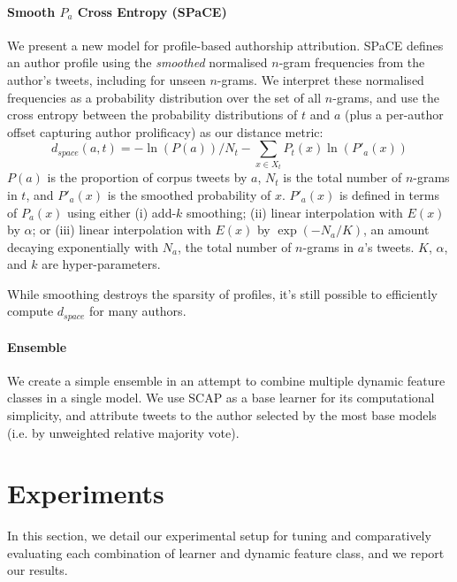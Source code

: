 \documentclass[twocolumn,10pt]{article}
\begin{document}
\paragraph{Smooth $P_a$ Cross Entropy (SPaCE)}
We present a new model for profile-based authorship attribution.
SPaCE defines an author profile using the \emph{smoothed}
normalised $n$-gram frequencies from the author's tweets,
including for unseen $n$-grams. 
We interpret these normalised frequencies as a probability
distribution over the set of all $n$-grams, and use the cross
entropy between the probability distributions of $t$ and $a$
(plus a per-author offset capturing author prolificacy)
as our distance metric:
$$
d_{space}(a, t) =
    - \ln (P(a)) / N_t
    - \sum_{x \in X_t} P_t(x) \ln (P'_a(x))
$$
$P(a)$ is the proportion of corpus tweets by $a$,
$N_t$ is the total number of $n$-grams in $t$, and
$P'_a(x)$ is the smoothed probability of $x$.
$P'_a(x)$ is defined in terms of $P_a(x)$ using either
(i)   add-$k$ smoothing;
(ii)  linear interpolation with $E(x)$ by $\alpha$; or
(iii) linear interpolation with $E(x)$ by $\exp(-N_a/K)$,
      an amount decaying exponentially with $N_a$,
      the total number of $n$-grams in $a$'s tweets.
$K$, $\alpha$, and $k$ are hyper-parameters.

While smoothing destroys the sparsity of profiles, it's still
possible to efficiently compute $d_{space}$ for many authors.\footnotemark
{}

\paragraph{Ensemble}
We create a simple ensemble in an attempt to combine multiple
dynamic feature classes in a single model.
We use SCAP as a base learner for its computational simplicity,
and attribute tweets to the author selected by the most
base models (i.e. by unweighted relative majority vote).




\section{Experiments}
In this section, we detail our experimental setup for tuning
and comparatively evaluating each combination of learner and dynamic feature class, and we report our results.
\end{document}
